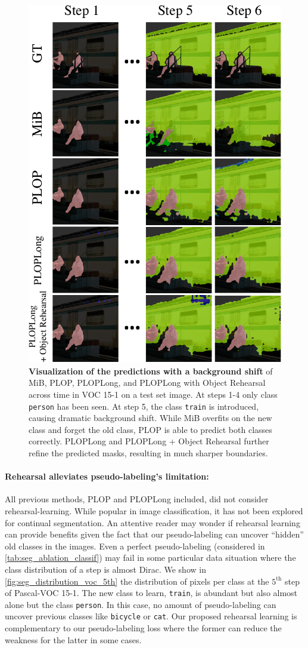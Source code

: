 \begin{figure}
    \centering
    \includegraphics[width=0.7\linewidth]{images/seg/visualization_gt_shift2.pdf}
    \caption{\textbf{Visualization of the predictions with a background shift} of MiB, PLOP,
        PLOPLong, and PLOPLong with Object Rehearsal across time in VOC 15-1 on a test set image. At
        steps 1-4 only class \texttt{person} has been seen. At step 5, the class \texttt{train} is
        introduced, causing dramatic background shift. While MiB overfits on the new class and
        forget the old class, PLOP is able to predict both classes correctly. PLOPLong and PLOPLong
        + Object Rehearsal further refine the predicted masks, resulting in much sharper
        boundaries.}
    \label{fig:seg_visualization_gt_shift}
\end{figure}

\paragraph{Rehearsal alleviates pseudo-labeling's limitation:} All previous methods, PLOP and
PLOPLong included, did not consider rehearsal-learning. While popular in image classification, it
has not been explored for continual segmentation. An attentive reader may wonder if rehearsal
learning can provide benefits given the fact that our pseudo-labeling can uncover ``hidden'' old
classes in the images. Even a perfect pseudo-labeling (considered in
\autoref{tab:seg_ablation_classif}) may fail in some particular data situation where the class
distribution of a step is almost Dirac. We show in \autoref{fig:seg_distribution_voc_5th} the
distribution of pixels per class at the $5^{\text{th}}$ step of Pascal-VOC 15-1. The new class to
learn, \texttt{train}, is abundant but also almost alone but the class \texttt{person}. In this
case, no amount of pseudo-labeling can uncover previous classes like \texttt{bicycle} or
\texttt{cat}. Our proposed rehearsal learning is complementary to our pseudo-labeling loss where the
former can reduce the weakness for the latter in some cases.

